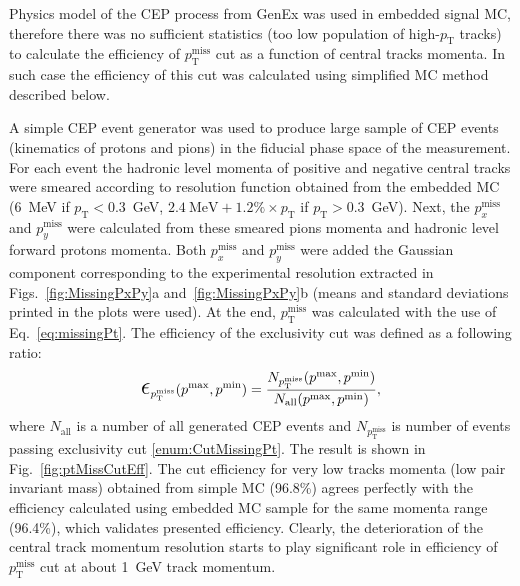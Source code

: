 Physics model of the CEP process from GenEx was used in embedded signal MC, therefore there was no sufficient statistics (too low population of high-$p_{\text{T}}$ tracks) to calculate the efficiency of $p_{\text{T}}^{\text{miss}}$ cut as a function of central tracks momenta. In such case the efficiency of this cut was calculated using simplified MC method described below.

A simple CEP event generator was used to produce large sample of CEP events (kinematics of protons and pions) in the fiducial phase space of the measurement. For each event the hadronic level momenta of positive and negative central tracks were smeared according to resolution function obtained from the embedded MC (6~MeV if $p_{\text{T}}<0.3$~GeV, $2.4~\text{MeV} + 1.2\%\times p_{\text{T}}$ if $p_{\text{T}}>0.3$~GeV). Next, the $p_{x}^{\text{miss}}$ and $p_{y}^{\text{miss}}$ were calculated from these smeared pions momenta and hadronic level forward protons momenta. Both $p_{x}^{\text{miss}}$ and $p_{y}^{\text{miss}}$ were added the Gaussian component corresponding to the experimental resolution extracted in Figs.~\ref{fig:MissingPxPy}a and~\ref{fig:MissingPxPy}b (means and standard deviations printed in the plots were used). At the end, $p_{\text{T}}^{\text{miss}}$ was calculated with the use of Eq.~\eqref{eq:missingPt}. The efficiency of the exclusivity cut was defined as a following ratio:
\begin{equation}\label{eq:ptMissCutEff}
 \mbox{\LARGE$\epsilon$}_{p_{\text{T}}^{\text{miss}}}(p^{\text{max}}, p^{\text{min}}) = \frac{N_{p_{\text{T}}^{\text{miss}}}(p^{\text{max}}, p^{\text{min}})}{N_{\text{all}}(p^{\text{max}}, p^{\text{min}})},
\end{equation}
where $N_{\text{all}}$ is a number of all generated CEP events and $N_{p_{\text{T}}^{\text{miss}}} $ is number of events passing exclusivity cut \ref{enum:CutMissingPt}. The result is shown in Fig.~\ref{fig:ptMissCutEff}. The cut efficiency for very low tracks momenta (low pair invariant mass) obtained from simple MC (96.8\%) agrees perfectly with the efficiency calculated using embedded MC sample for the same momenta range (96.4\%), which validates presented efficiency. Clearly, the deterioration of the central track momentum resolution starts to play significant role in efficiency of $p_{\text{T}}^{\text{miss}}$ cut at about 1~GeV track momentum.


